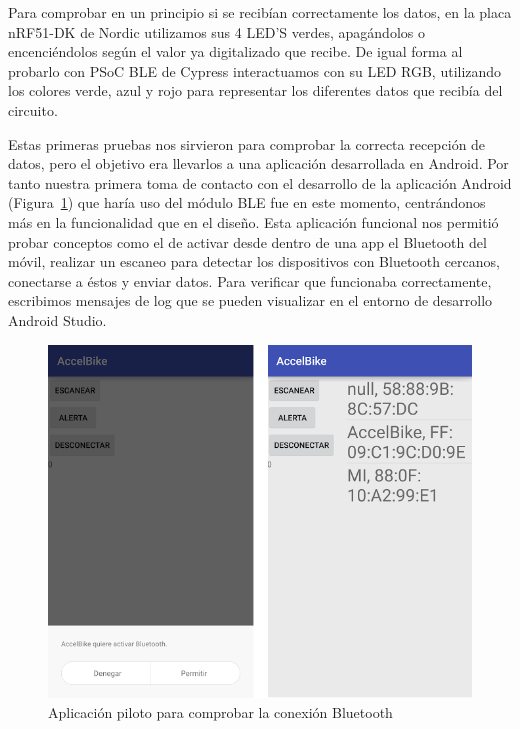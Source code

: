 Para comprobar en un principio si se recibían correctamente los datos, en la placa nRF51-DK de Nordic utilizamos sus 4 LED’S verdes, apagándolos o encenciéndolos según el valor ya digitalizado que recibe. De igual forma al probarlo con PSoC BLE de Cypress interactuamos con su LED RGB, utilizando los colores verde, azul y rojo para representar los diferentes datos que recibía del circuito.

Estas primeras pruebas nos sirvieron para comprobar la correcta recepción de datos, pero el objetivo era llevarlos a una aplicación desarrollada en Android. Por tanto nuestra primera toma de contacto con el desarrollo de la aplicación Android (Figura~\ref{figuraAPPPrueba}) que haría uso del módulo BLE fue en este momento, centrándonos más en la funcionalidad  que en el diseño. Esta aplicación funcional nos permitió probar conceptos como el de activar desde dentro de una app el Bluetooth del móvil, realizar un escaneo para detectar los dispositivos con Bluetooth cercanos, conectarse a éstos y enviar datos. Para verificar que funcionaba correctamente, escribimos mensajes de log  que se pueden visualizar en el entorno de desarrollo Android Studio.

\begin{figure}[h]%
	\centering 	
    \includegraphics[scale=0.8]{figures/app_piloto2.PNG} %
   	\caption[Aplicación piloto para comprobar la conexión Bluetooth]{Aplicación piloto para comprobar la conexión Bluetooth}
   	\label{figuraAPPPrueba}
\end{figure}

